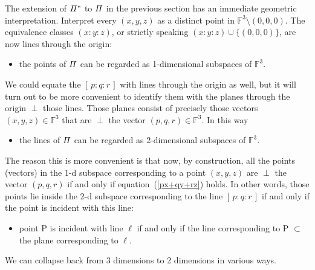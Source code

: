 \documentclass[12pt]{article}
\def\Fset{\mathbb{F}}
\begin{document}
The extension of $\mit\Pi^*$ to $\mit\Pi$ in the previous section has an
immediate geometric interpretation. Interpret every $(x,y,z)$ as a distinct
point in $\Fset^3 \setminus (0,0,0)$. The equivalence classes $(x:y:z)$, or
strictly speaking $(x:y:z)\cup\{(0,0,0)\}$, are now lines through the origin:
%
\begin{itemize}

\item the {\sc point}s of $\mit\Pi$ can be regarded as 1-dimensional subspaces of
      $\Fset^3$.

\end{itemize}
%
We could equate the $[\,p:q:r\,]$ with lines through the origin as well, but it
will turn out to be more convenient to identify them with the planes through
the origin $\perp$ those lines. Those planes consist of precisely those vectors
$(x,y,z) \in \Fset^3$ that are $\perp$ the vector $(p,q,r) \in \Fset^3$.
In this way
%
\begin{itemize}

\item the {\sc line}s of $\mit\Pi$ can be regarded as 2-dimensional subspaces of
      $\Fset^3$.

\end{itemize}
%
The reason this is more convenient is that now, by construction, all the
points (vectors) in the 1-d subspace corresponding to a {\sc point} $(x,y,z)$ are
$\perp$ the vector $(p,q,r)$ if and only if equation~(\ref{px+qy+rz}) holds. In other
words, those points lie inside the 2-d subspace corresponding to the {\sc line}
$[\,p:q:r\,]$ if and only if the {\sc point} is incident with this {\sc line}:
%
\begin{itemize}

\item {\sc point} P is incident with {\sc line} $\ell$ if and only if the line corresponding
      to P $\subset$ the plane corresponding to $\ell$.

\end{itemize}
%
We can collapse back from 3 dimensions to 2 dimensions in various ways.
\end{document}

